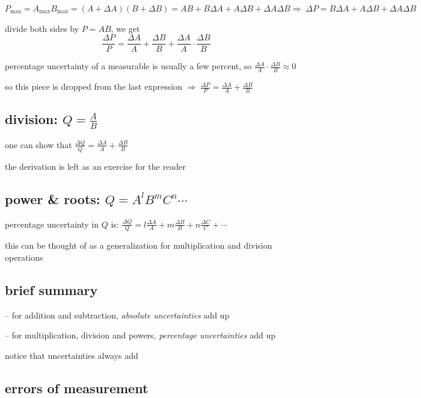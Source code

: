 \documentclass[a4paper,12pt]{book}
\newcounter{exercise}[chapter]
\newcommand{\cmt}{}
\newenvironment{ilight}
  {\centering
  	\vspace*{6pt}
  	\begin{tcolorbox}[colframe=Gray,colback=LightGrey!15]
  \setlength{\baselineskip}{\baselineskip}%
  }
  {\end{tcolorbox}\vspace*{-4pt}}
\newcommand{\tmax}{\text{max}}
\newcommand{\RA}{\Rightarrow\;}
\newcommand{\cmt}{}
\begin{document}
$P_\tmax = A_\tmax B_\tmax = (A + \Delta A)(B + \Delta B) = AB + B\Delta A + A\Delta B + \Delta A \Delta B \RA \Delta P =  B\Delta A + A\Delta B + \Delta A \Delta B$

divide both sides by $P=AB$, we get
\begin{equation*}
\frac{\Delta P}{P} = \frac{\Delta A}{A} + \frac{\Delta B}{B} + \frac{\Delta A}{A}\cdot\frac{\Delta B}{B}
\end{equation*}

percentage uncertainty of a measurable is usually a few percent, so $\frac{\Delta A}{A}\cdot\frac{\Delta B}{B} \approx 0$

so this piece is dropped from the last expression $\RA \boxed{\frac{\Delta P}{P} = \frac{\Delta A}{A} + \frac{\Delta B}{B}}$

\subsection*{division: $Q=\frac{A}{B}$}

one can show that $\boxed{\frac{\Delta Q}{Q} = \frac{\Delta A}{A} + \frac{\Delta B}{B}}$

the derivation is left as an exercise for the reader

\subsection*{power \& roots: $Q=A^l B^m C^n\cdots$}

percentage uncertainty in $Q$ is: $\frac{\Delta Q}{Q} = l\frac{\Delta A}{A} + m\frac{\Delta B}{B} + n\frac{\Delta C}{C} +\cdots$

this can be thought of as a generalization for multiplication and division operations

\subsection*{brief summary}

\begin{ilight}
	-- for addition and subtraction, \emph{absolute uncertainties} add up
	
	-- for multiplication, division and powers, \emph{percentage uncertainties} add up
	
\end{ilight}

\cmt notice that uncertainties always add

\newpage

\subsection{errors of measurement}
\end{document}
